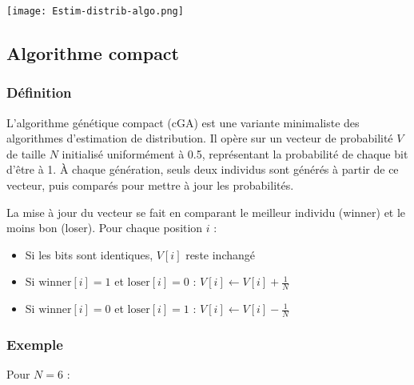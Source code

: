 \documentclass{article}
\begin{document}
\texttt{[image: Estim-distrib-algo.png]}

\subsection{Algorithme compact}
\subsubsection{Définition}
L'algorithme génétique compact (cGA) est une variante minimaliste des algorithmes d'estimation de distribution. Il opère sur un vecteur de probabilité $V$ de taille $N$ initialisé uniformément à 0.5, représentant la probabilité de chaque bit d'être à 1. À chaque génération, seuls deux individus sont générés à partir de ce vecteur, puis comparés pour mettre à jour les probabilités.

La mise à jour du vecteur se fait en comparant le meilleur individu (winner) et le moins bon (loser). Pour chaque position $i$ :
\begin{itemize}
    \item Si les bits sont identiques, $V[i]$ reste inchangé
    \item Si $\text{winner}[i] = 1$ et $\text{loser}[i] = 0$ : $V[i] \leftarrow V[i] + \frac{1}{N}$
    \item Si $\text{winner}[i] = 0$ et $\text{loser}[i] = 1$ : $V[i] \leftarrow V[i] - \frac{1}{N}$
\end{itemize}

\subsubsection{Exemple}
Pour $N = 6$ :
\end{document}
